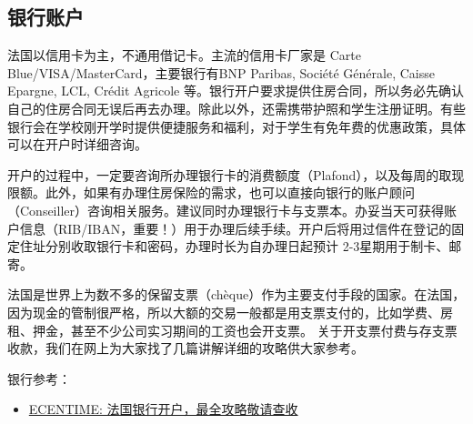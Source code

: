 \subsection{银行账户}

法国以信用卡为主，不通用借记卡。主流的信用卡厂家是 Carte Blue/VISA/MasterCard，主要银行有BNP Paribas, Société Générale, Caisse Epargne, LCL, Crédit Agricole 等。银行开户要求提供住房合同，所以务必先确认自己的住房合同无误后再去办理。除此以外，还需携带护照和学生注册证明。有些银行会在学校刚开学时提供便捷服务和福利，对于学生有免年费的优惠政策，具体可以在开户时详细咨询。

开户的过程中，一定要咨询所办理银行卡的消费额度（Plafond），以及每周的取现限额。此外，如果有办理住房保险的需求，也可以直接向银行的账户顾问（Conseiller）咨询相关服务。建议同时办理银行卡与支票本。办妥当天可获得账户信息（RIB/IBAN，重要！）用于办理后续手续。开户后将用过信件在登记的固定住址分别收取银行卡和密码，办理时长为自办理日起预计 2-3星期用于制卡、邮寄。

法国是世界上为数不多的保留支票（chèque）作为主要支付手段的国家。在法国，因为现金的管制很严格，所以大额的交易一般都是用支票支付的，比如学费、房租、押金，甚至不少公司实习期间的工资也会开支票。 关于开支票付费与存支票收款，我们在网上为大家找了几篇讲解详细的攻略供大家参考。

银行参考：
\begin{itemize}
    \item \href{https://www.ecentime.com/article/creation-compte-bancaire}{ECENTIME: 法国银行开户，最全攻略敬请查收}
\end{itemize}

